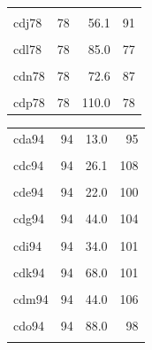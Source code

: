 \documentclass[draft,linenumbers]{agujournal2018}
\begin{document}
\begin{landscape}
\begin{table}
\begin{tabular}[t]{lrrr}
\cellcolor{gray!6}{cdi78} & \cellcolor{gray!6}{78} & \cellcolor{gray!6}{34.0} & \cellcolor{gray!6}{97}\\
cdj78 & 78 & 56.1 & 91\\
\addlinespace
\cellcolor{gray!6}{cdk78} & \cellcolor{gray!6}{78} & \cellcolor{gray!6}{68.0} & \cellcolor{gray!6}{84}\\
cdl78 & 78 & 85.0 & 77\\
\cellcolor{gray!6}{cdm78} & \cellcolor{gray!6}{78} & \cellcolor{gray!6}{44.0} & \cellcolor{gray!6}{78}\\
cdn78 & 78 & 72.6 & 87\\
\cellcolor{gray!6}{cdo78} & \cellcolor{gray!6}{78} & \cellcolor{gray!6}{88.0} & \cellcolor{gray!6}{85}\\
\addlinespace
cdp78 & 78 & 110.0 & 78\\
\bottomrule
\end{tabular}
\centering
\begin{tabular}[t]{lrrr}
\toprule
\cellcolor{gray!6}{Model} & \cellcolor{gray!6}{$z_{1100}$} & \cellcolor{gray!6}{$\Phi$} & \cellcolor{gray!6}{$z_c$}\\
\midrule
cda94 & 94 & 13.0 & 95\\
\cellcolor{gray!6}{cdb94} & \cellcolor{gray!6}{94} & \cellcolor{gray!6}{21.5} & \cellcolor{gray!6}{101}\\
cdc94 & 94 & 26.1 & 108\\
\cellcolor{gray!6}{cdd94} & \cellcolor{gray!6}{94} & \cellcolor{gray!6}{32.6} & \cellcolor{gray!6}{113}\\
cde94 & 94 & 22.0 & 100\\
\addlinespace
\cellcolor{gray!6}{cdf94} & \cellcolor{gray!6}{94} & \cellcolor{gray!6}{36.3} & \cellcolor{gray!6}{104}\\
cdg94 & 94 & 44.0 & 104\\
\cellcolor{gray!6}{cdh94} & \cellcolor{gray!6}{94} & \cellcolor{gray!6}{55.0} & \cellcolor{gray!6}{104}\\
cdi94 & 94 & 34.0 & 101\\
\cellcolor{gray!6}{cdj94} & \cellcolor{gray!6}{94} & \cellcolor{gray!6}{56.1} & \cellcolor{gray!6}{102}\\
\addlinespace
cdk94 & 94 & 68.0 & 101\\
\cellcolor{gray!6}{cdl94} & \cellcolor{gray!6}{94} & \cellcolor{gray!6}{85.0} & \cellcolor{gray!6}{107}\\
cdm94 & 94 & 44.0 & 106\\
\cellcolor{gray!6}{cdn94} & \cellcolor{gray!6}{94} & \cellcolor{gray!6}{72.6} & \cellcolor{gray!6}{102}\\
cdo94 & 94 & 88.0 & 98\\
\addlinespace
\cellcolor{gray!6}{cdp94} & \cellcolor{gray!6}{94} & \cellcolor{gray!6}{110.0} & \cellcolor{gray!6}{108}\\
\bottomrule
\end{tabular}
\end{table}
\end{landscape}
\end{document}
